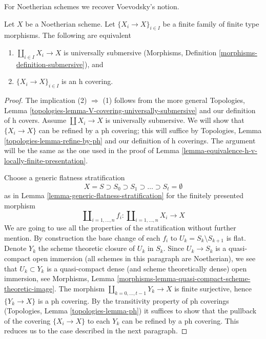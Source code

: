 \noindent
For Noetherian schemes we recover Voevodsky's notion.

\begin{lemma}
\label{lemma-Noetherian-h-covering}
Let $X$ be a Noetherian scheme. Let $\{X_i \to X\}_{i \in I}$
be a finite family of finite type morphisms. The following are equivalent
\begin{enumerate}
\item $\coprod_{i \in I} X_i \to X$ is universally submersive
(Morphisms, Definition
\ref{morphisms-definition-submersive}), and
\item $\{X_i \to X\}_{i \in I}$ is an h covering.
\end{enumerate}
\end{lemma}

\begin{proof}
The implication (2) $\Rightarrow$ (1) follows from the more general
Topologies, Lemma \ref{topologies-lemma-V-covering-universally-submersive}
and our definition of h covers. Assume $\coprod X_i \to X$
is universally submersive. We will show that $\{X_i \to X\}$
can be refined by a ph covering; this will suffice by
Topologies, Lemma \ref{topologies-lemma-refine-by-ph} and
our definition of h coverings.
The argument will be the same as the one used in the proof of
Lemma \ref{lemma-equivalence-h-v-locally-finite-presentation}.

\medskip\noindent
Choose a generic flatness stratification
$$
X = S \supset S_0 \supset S_1 \supset \ldots \supset S_t = \emptyset
$$
as in Lemma \ref{lemma-generic-flatness-stratification}
for the finitely presented morphism
$$
\coprod\nolimits_{i = 1, \ldots, n} f_i :
\coprod\nolimits_{i = 1, \ldots, n} X_i
\longrightarrow
X
$$
We are going to use all the properties of the stratification
without further mention. By construction the base change of each
$f_i$ to $U_k = S_k \setminus S_{k + 1}$ is flat.
Denote $Y_k$ the scheme theoretic closure of $U_k$ in $S_k$. Since
$U_k \to S_k$ is a quasi-compact open immersion (all schemes in
this paragraph are Noetherian),
we see that $U_k \subset Y_k$ is a quasi-compact dense
(and scheme theoretically dense) open immersion, see
Morphisms, Lemma \ref{morphisms-lemma-quasi-compact-scheme-theoretic-image}.
The morphism $\coprod_{k = 0, \ldots, t - 1} Y_k \to X$
is finite surjective, hence $\{Y_k \to X\}$ is a ph covering.
By the transitivity property of ph coverings
(Topologies, Lemma \ref{topologies-lemma-ph})
it suffices to show that the pullback of
the covering $\{X_i \to X\}$ to each $Y_k$ can be refined by a
ph covering. This reduces us to the case described in the
next paragraph.


\end{proof}
